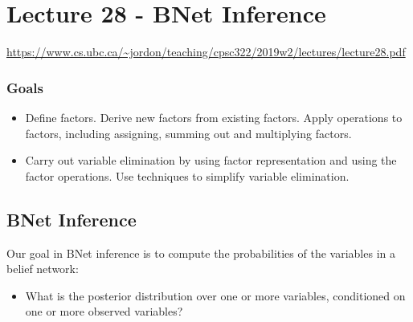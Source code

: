 \documentclass{article}
\begin{document}
\section*{Lecture 28 - BNet Inference}
\url{https://www.cs.ubc.ca/~jordon/teaching/cpsc322/2019w2/lectures/lecture28.pdf}
\subsubsection*{Goals}
\begin{itemize}
	\item Define factors. Derive new factors from existing factors. Apply operations to factors, including assigning, summing out and multiplying factors.
	\item Carry out variable elimination by using factor representation and using the factor operations. Use techniques to simplify variable elimination.
\end{itemize}

\subsection*{BNet Inference}
Our goal in BNet inference is to compute the probabilities of the variables in a belief network:
\begin{itemize}
	\item What is the posterior distribution over one or more variables, conditioned on one or more observed variables?
\end{itemize}
\end{document}

